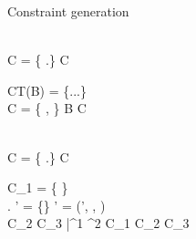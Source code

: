 \begin{figure*}[t!]

\myendrules

\caption{Constraint generation}
\label{fig:constraint-gen-1}
\end{figure*}

\begin{figure*}[t!]

\beginrules

\\


  {
    C = \{ \rgn \in \A.\rhoenv \}
  }
  {
    \typeok {\A} {\ObjZ\inang{\rgn}} {C}
  }

  {
    CT(B) = \{...\}
    \spc
    \\
    C = \{ \rbar \in \rhoenv, \isvalid{\phicx}{[\rbar/\rhobar, \tbar/\bar{\tyvar}](\phi)} \}
  }
  {
    \typeok {(\rhoenv,\aenv,\phicx)} {B\inang{\rbar}\inang{\tbar}} {C}
  }

  {
     \spc
     \spc
    \\
    C = \{ \rgn \in \A.\rhoenv \}
  }
  {
     {C}
  }

  {
    C_1 = \{ \rgn \in \rhoenv \}
    \\
    \rhobar \notin \A.\rhoenv \spc
    \rhoenv' = \rhoenv \cup \{\rhobar\} \spc
    \A' = (\rhoenv', \aenv, \phicx \conj \phi)
    \\
    \spc 
     {C_2} \spc
     {C_3}
  }
  {
    \typeok{(\rhoenv,\aenv,\phicx)} {\inang{\rhobar \,|\, \phi} \bar{\tau^1} \xrightarrow{\rgn} \tau^2} 
       {C_1 \cup C_2 \cup C_3}
  }


\end{figure*}
